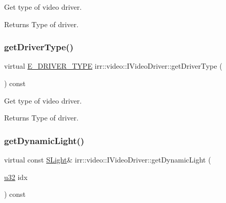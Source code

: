 Get type of video driver. 

\begin{DoxyReturn}{Returns}
Type of driver. 
\end{DoxyReturn}
\mbox{\label{classirr_1_1video_1_1IVideoDriver_af89a0c4fcc0337f3befe8b90424e68aa}} 
\subsubsection{\texorpdfstring{get\+Driver\+Type()}{getDriverType()}\hspace{0.1cm}{\footnotesize\ttfamily [2/2]}}
{\footnotesize\ttfamily virtual \hyperlink{namespaceirr_1_1video_ae35a6de6d436c76107ad157fe42356d0}{E\+\_\+\+D\+R\+I\+V\+E\+R\+\_\+\+T\+Y\+PE} irr\+::video\+::\+I\+Video\+Driver\+::get\+Driver\+Type (\begin{DoxyParamCaption}{ }\end{DoxyParamCaption}) const\hspace{0.3cm}{\ttfamily [pure virtual]}}



Get type of video driver. 

\begin{DoxyReturn}{Returns}
Type of driver. 
\end{DoxyReturn}
\mbox{\label{classirr_1_1video_1_1IVideoDriver_a9eb9ee246e85a56300031f7d7516054e}} 
\subsubsection{\texorpdfstring{get\+Dynamic\+Light()}{getDynamicLight()}\hspace{0.1cm}{\footnotesize\ttfamily [1/2]}}
{\footnotesize\ttfamily virtual const \hyperlink{structirr_1_1video_1_1SLight}{S\+Light}\& irr\+::video\+::\+I\+Video\+Driver\+::get\+Dynamic\+Light (\begin{DoxyParamCaption}\item[{\hyperlink{namespaceirr_a0416a53257075833e7002efd0a18e804}{u32}}]{idx }\end{DoxyParamCaption}) const\hspace{0.3cm}{\ttfamily [pure virtual]}}



